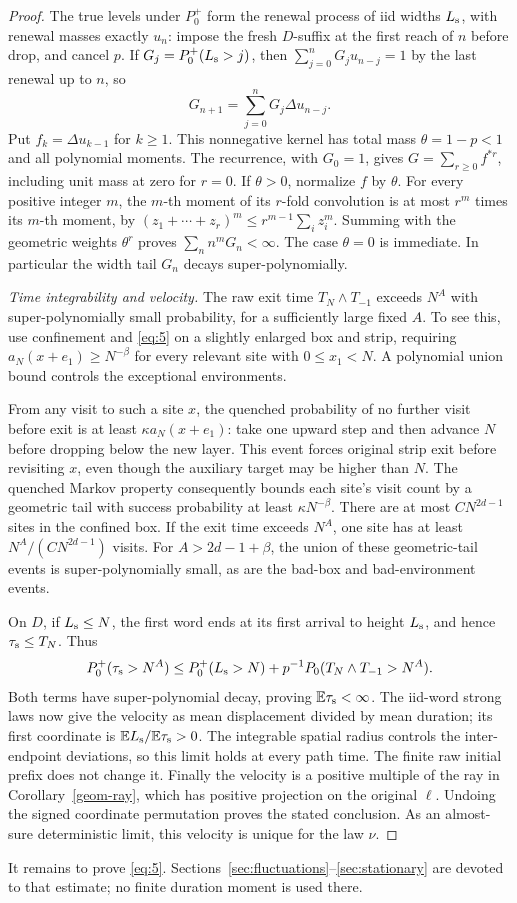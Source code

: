 \begin{proof}
The true levels under \(P_0^+\) form the renewal process of iid widths \(L_{\rm s}\), with renewal masses exactly \(u_n\): impose the fresh \(D\)-suffix at the first reach of \(n\) before drop, and cancel \(p\). If \(G_j=P_0^+(L_{\rm s}>j)\), then \(\sum_{j=0}^n G_j u_{n-j}=1\) by the last renewal up to \(n\), so
\[
G_{n+1}=\sum_{j=0}^n G_j\Delta u_{n-j}.
\]
Put \(f_k=\Delta u_{k-1}\) for \(k\ge1\). This nonnegative kernel has
total mass \(\theta=1-p<1\) and all polynomial moments. The recurrence,
with \(G_0=1\), gives \(G=\sum_{r\ge0}f^{*r}\), including unit mass
at zero for \(r=0\). If \(\theta>0\), normalize \(f\) by \(\theta\).
For every positive integer \(m\), the \(m\)-th moment of its
\(r\)-fold convolution is at most \(r^m\) times its \(m\)-th moment,
by
\((z_1+\cdots+z_r)^m\le r^{m-1}\sum_i z_i^m\).
Summing with the geometric weights \(\theta^r\) proves
\(\sum_n n^mG_n<\infty\). The case \(\theta=0\) is immediate.
In particular the width tail \(G_n\) decays super-polynomially.

\smallskip\noindent\emph{Time integrability and velocity.}
The raw exit time \(T_N\wedge T_{-1}\) exceeds \(N^A\) with
super-polynomially small probability, for a sufficiently large fixed
\(A\). To see this, use confinement and \eqref{eq:5} on a slightly
enlarged box and strip, requiring
\(a_N(x+e_1)\ge N^{-\beta}\) for every relevant site with
\(0\le x_1<N\). A polynomial union bound controls the exceptional
environments.

From any visit to such a site \(x\), the quenched probability of no
further visit before exit is at least \(\kappa a_N(x+e_1)\): take one
upward step and then advance \(N\) before dropping below the new layer.
This event forces original strip exit before revisiting \(x\), even
though the auxiliary target may be higher than \(N\). The quenched
Markov property consequently bounds each site's visit count by a
geometric tail with success probability at least \(\kappa N^{-\beta}\).
There are at most \(CN^{2d-1}\) sites in the confined box. If the exit
time exceeds \(N^A\), one site has at least
\(N^A/(CN^{2d-1})\) visits. For \(A>2d-1+\beta\), the union of these
geometric-tail events is super-polynomially small, as are the bad-box
and bad-environment events.

On \(D\), if \(L_{\rm s}\le N\), the first word ends at its first
arrival to height \(L_{\rm s}\), and hence
\(\tau_{\rm s}\le T_N\). Thus
\[
P_0^+(\tau_{\rm s}>N^A)
\le P_0^+(L_{\rm s}>N)
+p^{-1}P_0(T_N\wedge T_{-1}>N^A).
\]
Both terms have super-polynomial decay, proving
\(\mathbb E\tau_{\rm s}<\infty\). The iid-word strong laws now give
the velocity as mean displacement divided by mean duration; its first
coordinate is \(\mathbb E L_{\rm s}/\mathbb E\tau_{\rm s}>0\).
The integrable spatial radius controls the inter-endpoint deviations,
so this limit holds at every path time. The finite raw initial prefix
does not change it. Finally the velocity is a positive multiple of the
ray in Corollary~\ref{geom-ray}, which has positive projection on the
original \(\ell\). Undoing the signed coordinate permutation proves
the stated conclusion. As an almost-sure deterministic limit, this
velocity is unique for the law \(\nu\).
\end{proof}

It remains to prove \eqref{eq:5}. Sections~\ref{sec:fluctuations}--\ref{sec:stationary}
are devoted to that estimate; no finite duration moment is used there.
